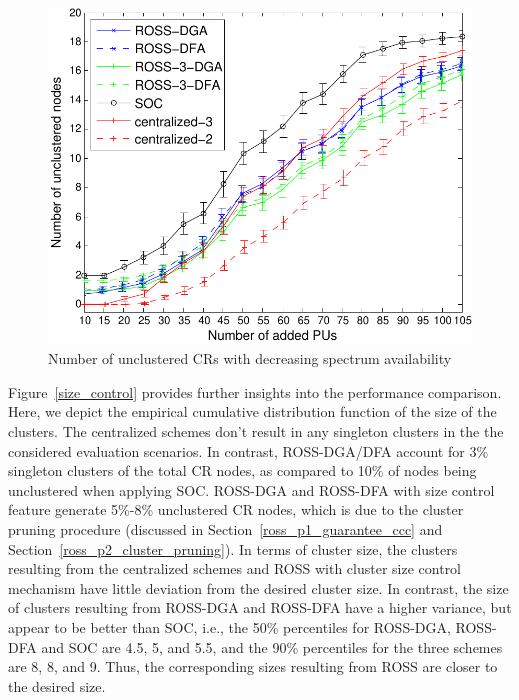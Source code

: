 \documentclass[times]{ettauth}
\theoremstyle{mytheoremstyle}
\theoremstyle{mytheoremstyle}
\theoremstyle{mytheoremstyle}
\begin{document}
\begin{figure}[th]
\begin{multicols}{3}
    \includegraphics[width=\linewidth]{survival_rate_20.pdf}\par\caption{Number of unclustered CRs with decreasing spectrum availability}\label{singleton_clusters}
\end{multicols}
\label{compare_dis_centralized}
\end{figure}

Figure~\ref{size_control} provides further insights into the performance comparison.
Here, we depict the empirical cumulative distribution function of the size of the clusters.
The centralized schemes don't result in any singleton clusters in the the considered evaluation scenarios.
In contrast, ROSS-DGA/DFA account for 3\% singleton clusters of the total CR nodes, as compared to 10\% of nodes being unclustered when applying SOC.
ROSS-DGA and ROSS-DFA with size control feature generate 5\%-8\% unclustered CR nodes, which is due to the cluster pruning procedure (discussed in Section~\ref{ross_p1_guarantee_ccc} and Section~\ref{ross_p2_cluster_pruning}).
In terms of cluster size, the clusters resulting from the centralized schemes and ROSS with cluster size control mechanism have little deviation from the desired cluster size.
In contrast, the size of clusters resulting from ROSS-DGA and ROSS-DFA have a higher variance, but appear to be better than SOC, i.e., the 50\% percentiles for ROSS-DGA, ROSS-DFA and SOC are 4.5, 5, and 5.5, and the 90\% percentiles for the three schemes are 8, 8, and 9.
Thus, the corresponding sizes resulting from ROSS are closer to the desired size.
\end{document}
